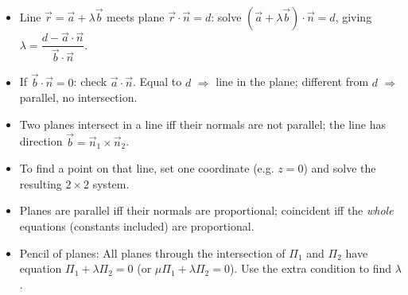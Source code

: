 \documentclass[11pt]{article}
\newcommand{\cle}[1]{{\popxbold\color{popdark}#1}}
\begin{document}
\begin{aretenir}
\begin{itemize}
\item Line $\vec{r}=\vec{a}+\lambda\vec{b}$ meets plane $\vec{r}\cdot\vec{n}=d$: solve $(\vec{a}+\lambda\vec{b})\cdot\vec{n}=d$, giving $\lambda = \dfrac{d-\vec{a}\cdot\vec{n}}{\vec{b}\cdot\vec{n}}$.
\item If $\vec{b}\cdot\vec{n}=0$: check $\vec{a}\cdot\vec{n}$. Equal to $d$ $\Rightarrow$ line in the plane; different from $d$ $\Rightarrow$ parallel, no intersection.
\item Two planes intersect in a line iff their normals are not parallel; the line has direction $\vec{b}=\vec{n}_1\times\vec{n}_2$.
\item To find a point on that line, set one coordinate (e.g. $z=0$) and solve the resulting $2\times 2$ system.
\item Planes are parallel iff their normals are proportional; coincident iff the \emph{whole} equations (constants included) are proportional.
\item \cle{Pencil of planes}: All planes through the intersection of $\Pi_1$ and $\Pi_2$ have equation $\Pi_1 + \lambda\Pi_2 = 0$ (or $\mu\Pi_1 + \lambda\Pi_2 = 0$). Use the extra condition to find $\lambda$.
\end{itemize}
\end{aretenir}
\end{document}
